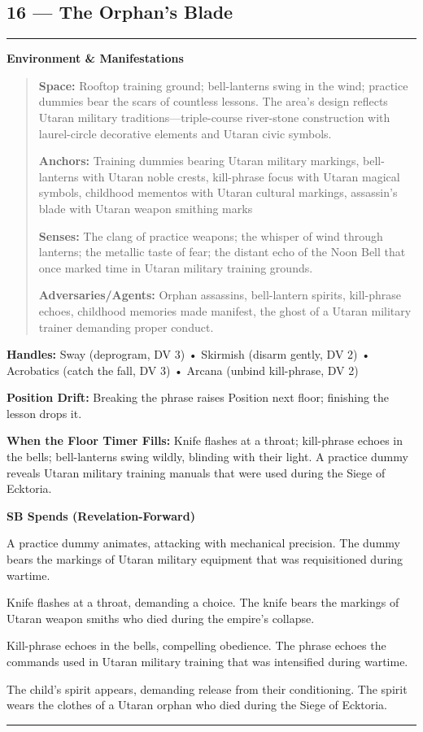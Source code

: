 \documentclass[18pt, letterpaper, twoside]{article}
\newenvironment{floorbox}[1]{%
    \begin{center}
    \begin{minipage}{0.95\textwidth}
    \subsection*{#1}
    \vspace{-0.5em}
    \rule{\textwidth}{0.5pt}
    \vspace{0.5em}
}{%
    \vspace{0.5em}
    \rule{\textwidth}{0.5pt}
    \end{minipage}
    \end{center}
}
\newenvironment{gmnote}[1]{%
    \vspace{0.5em}
    \noindent\textbf{#1}
    \begin{quote}
}{%
    \end{quote}
    \vspace{0.5em}
}
\newcommand{\handles}[1]{\noindent\textbf{Handles:} #1\par}
\newcommand{\sbitem}[2]{\item[#1 SB:] #2}
\begin{document}
\begin{floorbox}{16 --- The Orphan's Blade}
\begin{gmnote}{Environment \& Manifestations}
\textbf{Space:} Rooftop training ground; bell-lanterns swing in the wind; practice dummies bear the scars of countless lessons. The area's design reflects Utaran military traditions---triple-course river-stone construction with laurel-circle decorative elements and Utaran civic symbols.

\textbf{Anchors:} Training dummies bearing Utaran military markings, bell-lanterns with Utaran noble crests, kill-phrase focus with Utaran magical symbols, childhood mementos with Utaran cultural markings, assassin's blade with Utaran weapon smithing marks

\textbf{Senses:} The clang of practice weapons; the whisper of wind through lanterns; the metallic taste of fear; the distant echo of the Noon Bell that once marked time in Utaran military training grounds.

\textbf{Adversaries/Agents:} Orphan assassins, bell-lantern spirits, kill-phrase echoes, childhood memories made manifest, the ghost of a Utaran military trainer demanding proper conduct.
\end{gmnote}

\handles{Sway (deprogram, DV 3) • Skirmish (disarm gently, DV 2) • Acrobatics (catch the fall, DV 3) • Arcana (unbind kill-phrase, DV 2)}

\textbf{Position Drift:} Breaking the phrase raises Position next floor; finishing the lesson drops it.

\textbf{When the Floor Timer Fills:} Knife flashes at a throat; kill-phrase echoes in the bells; bell-lanterns swing wildly, blinding with their light. A practice dummy reveals Utaran military training manuals that were used during the Siege of Ecktoria.

\textbf{SB Spends (Revelation-Forward)}
\begin{description}[leftmargin=*, style=unboxed]
    \sbitem{1}{A practice dummy animates, attacking with mechanical precision. The dummy bears the markings of Utaran military equipment that was requisitioned during wartime.}
    \sbitem{2}{Knife flashes at a throat, demanding a choice. The knife bears the markings of Utaran weapon smiths who died during the empire's collapse.}
    \sbitem{3}{Kill-phrase echoes in the bells, compelling obedience. The phrase echoes the commands used in Utaran military training that was intensified during wartime.}
    \sbitem{4+}{The child's spirit appears, demanding release from their conditioning. The spirit wears the clothes of a Utaran orphan who died during the Siege of Ecktoria.}
\end{description}


\end{floorbox}
\end{document}
